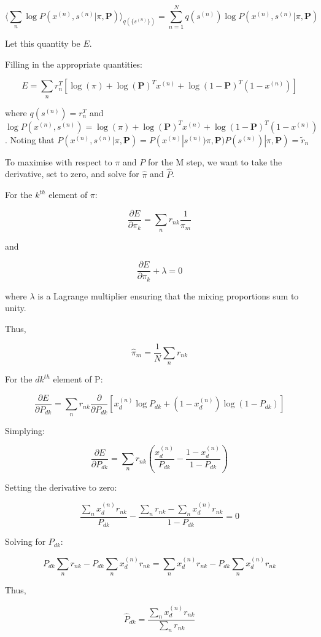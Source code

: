 \documentclass[12pt]{article}
\begin{document}
\begin{enumerate}
{$$\Bigg\langle \sum_n \log P(x^{(n)}, s^{(n)}| \pi, \mathbf{P})\Bigg\rangle_{q(\{s^{(n)}\})} = \sum_{n=1}^N q(s^{(n)}) \log P(x^{(n)}, s^{(n)}| \pi, \mathbf{P})$$

Let this quantity be $E$.

Filling in the appropriate quantities:

$$ E = \sum_n r_n^T[\log(\pi)+\log(\mathbf{P})^T x^{(n)} + \log(1-\mathbf{P})^T(1-x^{(n)})]$$

where $q(s^{(n)}) = r_n^T$ and $\log P(x^{(n)}, s^{(n)}) = \log(\pi)+\log(\mathbf{P})^T x^{(n)} + \log(1-\mathbf{P})^T(1-x^{(n)})$. Noting that $P(x^{(n)}, s^{(n)}| \pi, \mathbf{P}) = P(x^{(n)}|s^{(n)}) \pi, \mathbf{P}) P(s^{(n)})| \pi, \mathbf{P}) = \tilde{r}_{n}$

To maximise with respect to $\pi$ and $P$ for the M step, we want to take the derivative, set to zero, and solve for $\hat\pi$ and $\hat P$.

For the $k^{th}$ element of $\pi$:

$$\frac{\partial E}{\partial \pi_k} = \sum_n r_{nk} \frac{1}{\pi_m}$$

and

$$\frac{\partial E}{\partial \pi_k} + \lambda = 0$$

where $\lambda$ is a Lagrange multiplier ensuring that the mixing proportions sum to unity.

Thus,

$$\hat \pi_m = \frac{1}{N}\sum_{n}r_{nk}$$

For the $dk^{th}$ element of P:

$$\frac{\partial E}{\partial P_{dk}} = \sum_n r_{nk}\frac{\partial}{\partial P_{dk}}[x^{(n)}_{d}\log P_{dk}+(1-x^{(n)}_{d}) \log(1-P_{dk})]$$

Simplying:

$$\frac{\partial E}{\partial P_{dk}} = \sum_n r_{nk}(\frac{x^{(n)}_{d}}{ P_{dk}}-\frac{1-x^{(n)}_{d}}{1-P_{dk}})$$

Setting the derivative to zero:

$$\frac{\sum_n  x^{(n)}_{d}r_{nk}}{ P_{dk}}-\frac{\sum_n r_{nk}-\sum_n  x^{(n)}_{d}r_{nk}}{1-P_{dk}} = 0$$

Solving for $P_{dk}$:

$$P_{dk}\sum_n r_{nk}-P_{dk}\sum_n x^{(n)}_{d}r_{nk} = \sum_n  x^{(n)}_{d}r_{nk}-P_{dk}\sum_n  x^{(n)}_{d}r_{nk}$$

Thus,

$$\hat{P}_{dk} = \frac{\sum_n x^{(n)}_{d}r_{nk}}{\sum_n r_{nk}}$$

}
\end{enumerate}
\end{document}
